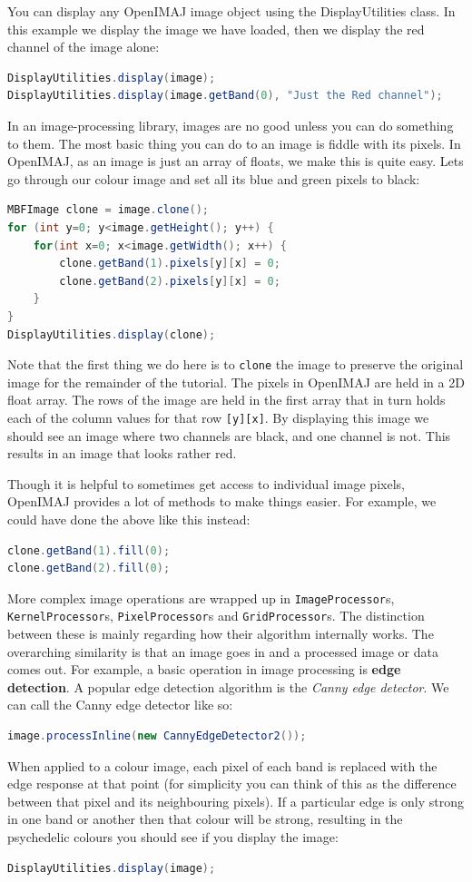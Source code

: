 \documentclass[10pt,a4paper,twoside,extrafontsizes]{memoir}
\begin{document}
You can display any OpenIMAJ image object using the DisplayUtilities class. In this example we display
the image we have loaded, then we display the red channel of the image alone:
\begin{lstlisting}[language=java]
DisplayUtilities.display(image);
DisplayUtilities.display(image.getBand(0), "Just the Red channel");
\end{lstlisting}

In an image-processing library, images are no good unless you can do something to them. The most basic 
thing you can do to an image is fiddle with its pixels. In OpenIMAJ, as an image is just an array of 
floats, we make this is quite easy. Lets go through our colour image and set all its blue and green 
pixels to black:
\begin{lstlisting}[language=java]
MBFImage clone = image.clone();
for (int y=0; y<image.getHeight(); y++) {
    for(int x=0; x<image.getWidth(); x++) {
        clone.getBand(1).pixels[y][x] = 0;
        clone.getBand(2).pixels[y][x] = 0;
    }
}
DisplayUtilities.display(clone);
\end{lstlisting}
Note that the first thing we do here is to \verb+clone+ the image to preserve the original image
for the remainder of the tutorial. The pixels in OpenIMAJ are held in a 2D float array. The rows 
of the image are held in the first array that in turn holds each of the column values for that 
row \verb+[y][x]+. By displaying this image we should see an image where two channels are black, 
and one channel is not. This results in an image that looks rather red.

Though it is helpful to sometimes get access to individual image pixels, OpenIMAJ provides a lot 
of methods to make things easier. For example, we could have done the above like this instead:
\begin{lstlisting}[language=java]
clone.getBand(1).fill(0);
clone.getBand(2).fill(0);
\end{lstlisting}

More complex image operations are wrapped up in \verb+ImageProcessor+s, \verb+KernelProcessor+s,
\verb+PixelProcessor+s and \verb+GridProcessor+s. The distinction between these is mainly 
regarding how their algorithm internally works. The overarching similarity is that an image goes 
in and a processed image or data comes out. For example, a basic operation in image processing 
is \textbf{edge detection}. A popular edge detection algorithm is the \emph{Canny edge detector}. 
We can call the Canny edge detector like so:
\begin{lstlisting}[language=java]
image.processInline(new CannyEdgeDetector2());
\end{lstlisting}
When applied to a colour image, each pixel of each band is replaced with the edge response at 
that point (for simplicity you can think of this as the difference between that pixel and its 
neighbouring pixels). If a particular edge is only strong in one band or another then that 
colour will be strong, resulting in the psychedelic colours you should see if you display 
the image:
\begin{lstlisting}[language=java]
DisplayUtilities.display(image);
\end{lstlisting}
\end{document}
